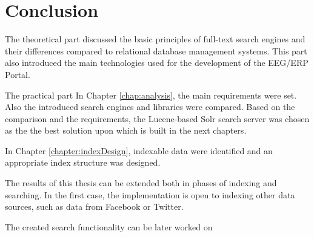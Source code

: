 \chapter{Conclusion}
\label{chap:conclusion}

The theoretical part discussed the basic principles of full-text search engines and their differences compared to relational database management systems. This part also introduced the main technologies used for the development of the EEG/ERP Portal.

The practical part
In Chapter \ref{chap:analysis}, the main requirements were set. Also the introduced search engines and libraries were compared. Based on the comparison and the requirements, the Lucene-based Solr search server was chosen as the the best solution upon which is built in the next chapters.

In Chapter \ref{chapter:indexDesign}, indexable data were identified and an appropriate index structure was designed.

The results of this thesis can be extended both in phases of indexing and searching. 
In the first case, the implementation is open to indexing other data sources, such as data from Facebook or Twitter.

The created search functionality can be later worked on

